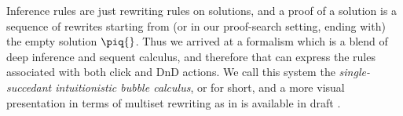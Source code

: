 
Inference rules are just rewriting rules on solutions, and a proof of a solution
is a sequence of rewrites starting from (or in our proof-search setting, ending
with) the empty solution $\piq{}$. Thus we arrived at a formalism which is a
blend of deep inference and sequent calculus, and therefore that can express the
rules associated with both click and DnD actions. We call this system the
\emph{single-succedant intuitionistic bubble calculus}, or  for short,
and a more visual presentation in terms of multiset rewriting as in
\cite{berry_chemical_1989} is available in draft \cite{ICPM}.


